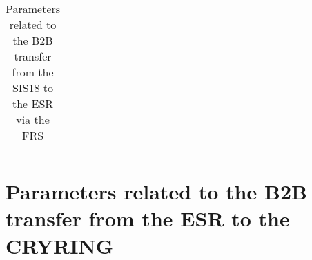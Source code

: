 \begin{longtable}{ | c | c | c | c | }
\caption{Parameters related to the B2B transfer from the SIS18 to the ESR via the FRS}
\label{18toESRvia the FRS}
    \end{longtable}
 
 


\newpage
\section{Parameters related to the B2B transfer from the ESR to the CRYRING}
\label{tab:ESRtoCRYRING}


